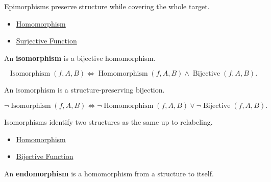 \begin{remark*}[Interpretation]
Epimorphisms preserve structure while covering the whole target.
\end{remark*}

\begin{dependencies}
\begin{itemize}
  \item \hyperref[def:algebraic-homomorphism]{Homomorphism}
  \item \hyperref[def:alg-surjective]{Surjective Function}
\end{itemize}
\end{dependencies}

\begin{definition}[Isomorphism]
\label{def:isomorphism}
An \textbf{isomorphism} is a bijective homomorphism.
\end{definition}

\begin{remark*}
\[
\operatorname{Isomorphism}(f,A,B)
\Longleftrightarrow
\operatorname{Homomorphism}(f,A,B)
\land
\operatorname{Bijective}(f,A,B).
\]
\end{remark*}

\begin{remark*}
An isomorphism is a structure-preserving bijection.
\end{remark*}

\begin{remark*}
\[
\neg\operatorname{Isomorphism}(f,A,B)
\Longleftrightarrow
\neg\operatorname{Homomorphism}(f,A,B)
\lor
\neg\operatorname{Bijective}(f,A,B).
\]
\end{remark*}

\begin{remark*}[Interpretation]
Isomorphisms identify two structures as the same up to relabeling.
\end{remark*}

\begin{dependencies}
\begin{itemize}
  \item \hyperref[def:algebraic-homomorphism]{Homomorphism}
  \item \hyperref[def:alg-bijective]{Bijective Function}
\end{itemize}
\end{dependencies}

\begin{definition}[Endomorphism]
\label{def:endomorphism}
An \textbf{endomorphism} is a homomorphism from a structure to itself.
\end{definition}

